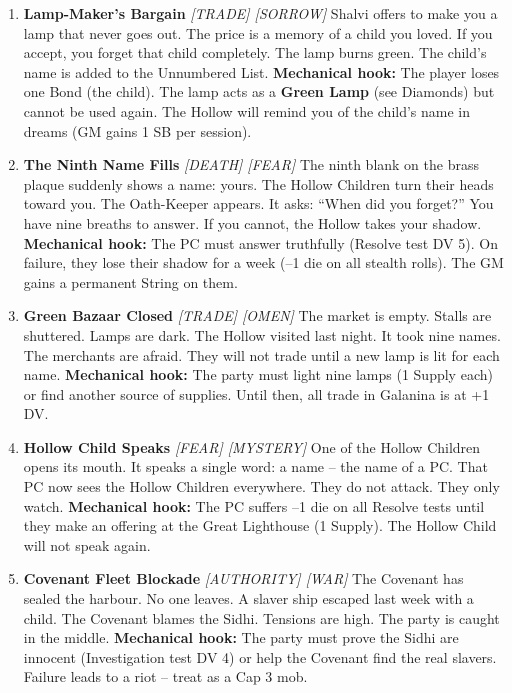 \begin{enumerate}
\item \textbf{Lamp-Maker's Bargain} \hfill \textit{[TRADE] [SORROW]}  
  Shalvi offers to make you a lamp that never goes out. The price is a memory of a child you loved. If you accept, you forget that child completely. The lamp burns green. The child's name is added to the Unnumbered List.  
  \textbf{Mechanical hook:} The player loses one Bond (the child). The lamp acts as a \textbf{Green Lamp} (see Diamonds) but cannot be used again. The Hollow will remind you of the child's name in dreams (GM gains 1 SB per session).

\item \textbf{The Ninth Name Fills} \hfill \textit{[DEATH] [FEAR]}  
  The ninth blank on the brass plaque suddenly shows a name: yours. The Hollow Children turn their heads toward you. The Oath-Keeper appears. It asks: ``When did you forget?'' You have nine breaths to answer. If you cannot, the Hollow takes your shadow.  
  \textbf{Mechanical hook:} The PC must answer truthfully (Resolve test DV 5). On failure, they lose their shadow for a week (--1 die on all stealth rolls). The GM gains a permanent String on them.

\item[J] \textbf{Green Bazaar Closed} \hfill \textit{[TRADE] [OMEN]}  
  The market is empty. Stalls are shuttered. Lamps are dark. The Hollow visited last night. It took nine names. The merchants are afraid. They will not trade until a new lamp is lit for each name.  
  \textbf{Mechanical hook:} The party must light nine lamps (1 Supply each) or find another source of supplies. Until then, all trade in Galanina is at +1 DV.

\item[Q] \textbf{Hollow Child Speaks} \hfill \textit{[FEAR] [MYSTERY]}  
  One of the Hollow Children opens its mouth. It speaks a single word: a name -- the name of a PC. That PC now sees the Hollow Children everywhere. They do not attack. They only watch.  
  \textbf{Mechanical hook:} The PC suffers --1 die on all Resolve tests until they make an offering at the Great Lighthouse (1 Supply). The Hollow Child will not speak again.

\item[K] \textbf{Covenant Fleet Blockade} \hfill \textit{[AUTHORITY] [WAR]}  
  The Covenant has sealed the harbour. No one leaves. A slaver ship escaped last week with a child. The Covenant blames the Sidhi. Tensions are high. The party is caught in the middle.  
  \textbf{Mechanical hook:} The party must prove the Sidhi are innocent (Investigation test DV 4) or help the Covenant find the real slavers. Failure leads to a riot -- treat as a Cap 3 mob.


\end{enumerate}
